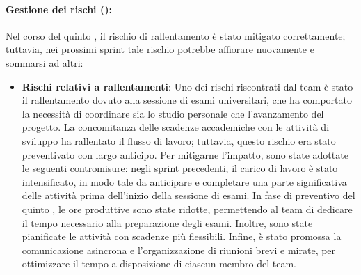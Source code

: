 \paragraph*{Gestione dei rischi ():}
\par Nel corso del quinto , il rischio di rallentamento è stato mitigato correttamente; tuttavia, nei prossimi sprint tale rischio potrebbe affiorare nuovamente e sommarsi ad altri:
\begin{itemize}
  \item \textbf{Rischi relativi a rallentamenti}: Uno dei rischi riscontrati dal team è stato il rallentamento dovuto alla sessione di esami universitari, che ha comportato la necessità di coordinare sia lo studio personale che l'avanzamento del progetto. La concomitanza delle scadenze accademiche con le attività di sviluppo ha rallentato il flusso di lavoro; tuttavia, questo rischio era stato preventivato con largo anticipo. Per mitigarne l'impatto, sono state adottate le seguenti contromisure: negli sprint precedenti, il carico di lavoro è stato intensificato, in modo tale da anticipare e completare una parte significativa delle attività prima dell'inizio della sessione di esami. In fase di preventivo del quinto , le ore produttive sono state ridotte, permettendo al team di dedicare il tempo necessario alla preparazione degli esami. Inoltre, sono state pianificate le attività con scadenze più flessibili. Infine, è stato promossa la comunicazione asincrona e l'organizzazione di riunioni brevi e mirate, per ottimizzare il tempo a disposizione di ciascun membro del team.
\end{itemize}

